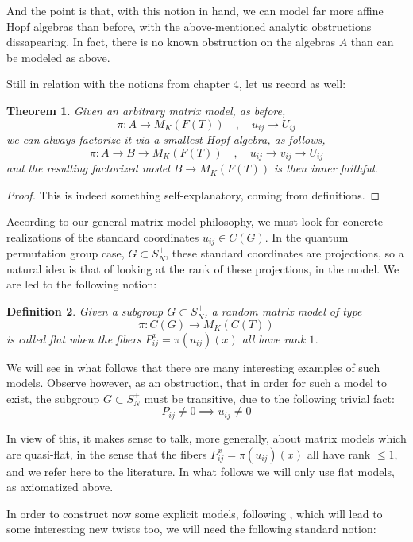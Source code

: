 \documentclass[12pt]{amsbook}
\newtheorem{theorem}{Theorem}[chapter]
\newtheorem{definition}[theorem]{Definition}
\begin{document}
And the point is that, with this notion in hand, we can model far more affine Hopf algebras than before, with the above-mentioned analytic obstructions dissapearing. In fact, there is no known obstruction on the algebras $A$ than can be modeled as above.

\bigskip

Still in relation with the notions from chapter 4, let us record as well:

\begin{theorem}
Given an arbitrary matrix model, as before,
$$\pi:A\to M_K(F(T))\quad,\quad u_{ij}\to U_{ij}$$
we can always factorize it via a smallest Hopf algebra, as follows,
$$\pi:A\to B\to M_K(F(T))\quad,\quad u_{ij}\to v_{ij}\to U_{ij}$$
and the resulting factorized model $B\to M_K(F(T))$ is then inner faithful.
\end{theorem} 

\begin{proof}
This is indeed something self-explanatory, coming from definitions.
\end{proof}

According to our general matrix model philosophy, we must look for concrete realizations of the standard coordinates $u_{ij}\in C(G)$. In the quantum permutation group case, $G\subset S_N^+$, these standard coordinates are projections, so a natural idea is that of looking at the rank of these projections, in the model. We are led to the following notion:

\begin{definition}
Given a subgroup $G\subset S_N^+$, a random matrix model of type
$$\pi:C(G)\to M_K(C(T))$$
is called flat when the fibers $P_{ij}^x=\pi(u_{ij})(x)$ all have rank $1$. 
\end{definition}

We will see in what follows that there are many interesting examples of such models. Observe however, as an obstruction, that in order for such a model to exist, the subgroup $G\subset S_N^+$ must be transitive, due to the following trivial fact:
$$P_{ij}\neq0\implies u_{ij}\neq0$$

In view of this, it makes sense to talk, more generally, about matrix models which are quasi-flat, in the sense that the fibers $P_{ij}^x=\pi(u_{ij})(x)$ all have rank $\leq1$, and we refer here to the literature. In what follows we will only use flat models, as axiomatized above.

\bigskip

In order to construct now some explicit models, following \cite{bne}, which will lead to some interesting new twists too, we will need the following standard notion:
\end{document}
